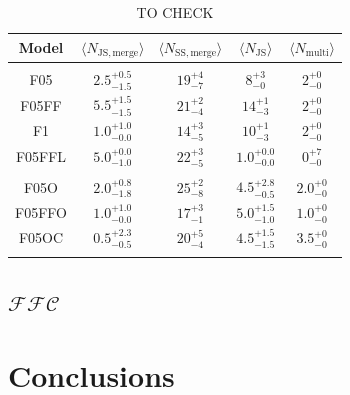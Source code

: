 \documentclass[submission,phys]{lib/SciPost}
\begin{document}
    \begin{table}
         \caption{TO CHECK}
        \label{Tab:M2Events} 
        \centering 
        \begin{tabular}{c c c c c}
        \hline\hline
        Model & $\langle N_{\mathrm{JS, merge}}\rangle$ & $\langle N_{\mathrm{SS, merge}}\rangle$ & $\langle N_{\mathrm{JS}}\rangle$ &  $\langle N_{\mathrm{multi}} \rangle$ \\
        \hline \vspace{-0.75em}\\ 
           F05     & $2.5^{+0.5}_{-1.5}$ & $19^{+4}_{-7}$ & $8^{+3}_{-0}$  & $2^{+0}_{-0}$ \vspace{0.25em}\\
           F05FF   & $5.5^{+1.5}_{-1.5}$ & $21^{+2}_{-4}$ & $14^{+1}_{-3}$ & $2^{+0}_{-0}$ \vspace{0.25em}\\
           F1      & $1.0^{+1.0}_{-0.0}$ & $14^{+3}_{-5}$ & $10^{+1}_{-3}$ & $2^{+0}_{-0}$ \vspace{0.25em}\\
           F05FFL  & $5.0^{+0.0}_{-1.0}$ & $22^{+3}_{-5}$ & $1.0^{+0.0}_{-0.0}$ & $0^{+7}_{-0}$ \vspace{0.25em}\\
           \hline \vspace{-0.75em}\\
           F05O    & $2.0^{+0.8}_{-1.8}$ & $25^{+2}_{-8}$ & $4.5^{+2.8}_{-0.5}$ & $2.0^{+0}_{-0}$ \vspace{0.25em}\\
           F05FFO  & $1.0^{+1.0}_{-0.0}$ & $17^{+3}_{-1}$ & $5.0^{+1.5}_{-1.0}$ & $1.0^{+0}_{-0}$ \vspace{0.25em}\\
           F05OC   & $0.5^{+2.3}_{-0.5}$ & $20^{+5}_{-4}$ & $4.5^{+1.5}_{-1.5}$ & $3.5^{+0}_{-0}$ \vspace{0.25em}\\
           \hline
         \hline                               %
         \label{Tab:Systems}
        \end{tabular}
     \end{table}
    \subsection{$\mathcal{FFC}$}
    

\section{Conclusions}
\end{document}
